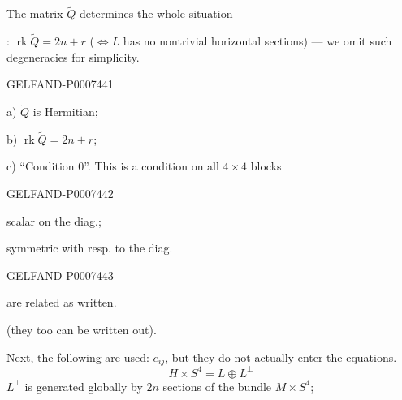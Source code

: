The matrix \(\widetilde Q\) determines the whole situation

: \(\operatorname{rk}\widetilde Q=2n+r\)
(\(\Leftrightarrow L\) has no nontrivial horizontal sections)
--- we omit such degeneracies for simplicity.


\begin{GelfandAdjacentEvidence}{GELFAND-P000744}{1}


a) \(\widetilde Q\) is Hermitian;

b) \(\operatorname{rk}\widetilde Q=2n+r\);

c) “Condition 0”. This is a condition on all \(4\times4\) blocks

\end{GelfandAdjacentEvidence}
\begin{GelfandAdjacentEvidence}{GELFAND-P000744}{2}

scalar on the diag.;

symmetric with resp. to the diag. 
\end{GelfandAdjacentEvidence}
\begin{GelfandAdjacentEvidence}{GELFAND-P000744}{3}

are related as written.

 (they too can be written out).

Next, the following are used: \(e_{ij}\), but they do not actually enter the equations.
\[
H\times S^4=L\oplus L^\perp
\]
\(L^\perp\) is generated globally by \(2n\) sections of the bundle \(M\times S^4\);
\end{GelfandAdjacentEvidence}
